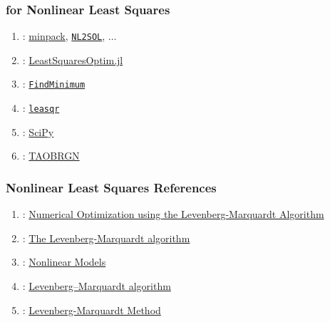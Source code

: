 %
\begin{frame}\frametitle{ for Nonlinear Least Squares}
\begin{enumerate}
	\item \mfortran: \href{\urlMinpack}{minpack}, \href{https://people.math.sc.edu/Burkardt/f_src/nl2sol/nl2sol.html}{\texttt{NL2SOL}}, $\dots$
	\item \julia: \href{https://juliapackages.com/p/leastsquaresoptim}{LeastSquaresOptim.jl}
	\item \mathematica: \href{https://reference.wolfram.com/language/ref/FindMinimum.html}{\texttt{FindMinimum}}
	\item \octave: \href{https://octave.sourceforge.io/optim/function/leasqr.html}{\texttt{leasqr}}
	\item \python: \href{https://docs.scipy.org/doc/scipy/reference/generated/scipy.optimize.curve_fit.html}{SciPy}
	\item \href{https://petsc.org/release/}{}: \href{https://petsc.org/release/manualpages/Tao/TAOBRGN/}{TAOBRGN}
\end{enumerate}
\end{frame}
%
\begin{frame}\frametitle{Nonlinear Least Squares References}
\begin{enumerate}
	\item {}: \href{https://mads.lanl.gov/presentations/Leif_LM_presentation_m.pdf}{Numerical Optimization using the
Levenberg-Marquardt Algorithm}\\[10pt]
	\item {}: \href{https://people.duke.edu/~hpgavin/ExperimentalSystems/lm.pdf}{The Levenberg-Marquardt algorithm}\\[10pt]
	\item {}: \href{https://www.foo.be/docs-free/Numerical_Recipe_In_C/c15-5.pdf}{Nonlinear Models}\\[10pt]
	\item {}: \href{https://en.wikipedia.org/wiki/Levenberg\%E2\%80\%93Marquardt_algorithm}{Levenberg–Marquardt algorithm}\\[10pt]
	\item {}: \href{https://mathworld.wolfram.com/Levenberg-MarquardtMethod.html}{Levenberg-Marquardt Method}
\end{enumerate}
\end{frame}

